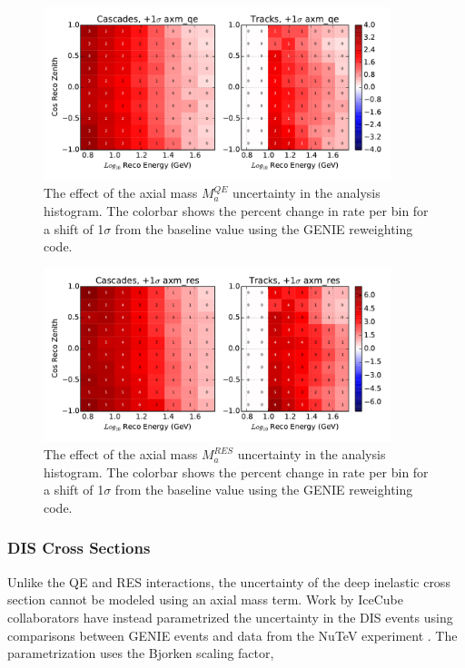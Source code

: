 \begin{figure}
\centering
\includegraphics[width=0.9\textwidth]{systematics/axm_qe_variation.pdf} 
\caption[Effect of $M_a^{QE}$ in the analysis histogram]{The effect of the axial mass $M_a^{QE}$ uncertainty in the analysis histogram. The colorbar shows the percent change in rate per bin for a shift of 1$\sigma$ from the baseline value using the GENIE reweighting code.}
\label{fig:systematics_axial_qe}
\end{figure}

\begin{figure}
\centering
\includegraphics[width=0.9\textwidth]{systematics/axm_res_variation.pdf} 
\caption[Effect of $M_a^{RES}$ in the analysis histogram]{The effect of the axial mass $M_a^{RES}$ uncertainty in the analysis histogram. The colorbar shows the percent change in rate per bin for a shift of 1$\sigma$ from the baseline value using the GENIE reweighting code.}
\label{fig:systematics_axial_res}
\end{figure}

\label{subsubsec:dis_systematics}
\subsubsection{DIS Cross Sections}
Unlike the QE and RES interactions, the uncertainty of the deep inelastic cross section cannot be modeled using an axial mass term.
Work by IceCube collaborators \cite{DIS-Reweighting} have instead parametrized the uncertainty in the DIS events using comparisons between GENIE events and data from the NuTeV experiment \cite{NuTeV-DIS,}.
The parametrization uses the Bjorken scaling factor,

